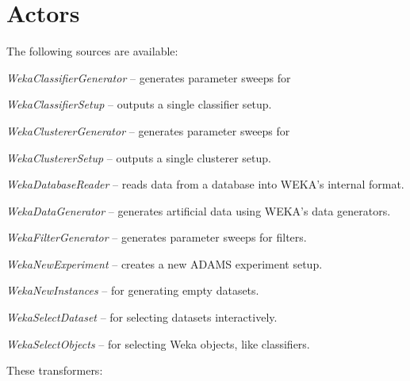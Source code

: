 \section{Actors}
The following sources are available:
\begin{tight_itemize}
	\item \textit{WekaClassifierGenerator} -- generates parameter sweeps for
	\item \textit{WekaClassifierSetup} -- outputs a single classifier setup.
	\item \textit{WekaClustererGenerator} -- generates parameter sweeps for
	\item \textit{WekaClustererSetup} -- outputs a single clusterer setup.
	\item \textit{WekaDatabaseReader} -- reads data from a database into
	WEKA's internal format.
	\item \textit{WekaDataGenerator} -- generates artificial data using WEKA's
	data generators.
	\item \textit{WekaFilterGenerator} -- generates parameter sweeps for
	filters.
	\item \textit{WekaNewExperiment} -- creates a new ADAMS experiment setup.
	\item \textit{WekaNewInstances} -- for generating empty datasets.
	\item \textit{WekaSelectDataset} -- for selecting datasets interactively.
	\item \textit{WekaSelectObjects} -- for selecting Weka objects, like
	classifiers.
\end{tight_itemize}
These transformers:
